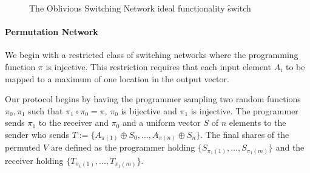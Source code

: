 \begin{figure}[ht]
	\caption{The Oblivious Switching Network ideal functionality \f{switch}}
	\label{fig:perm-ideal}	
\end{figure}


\paragraph{Permutation Network}

We begin with a restricted class of switching networks where the programming function $\pi$ is injective. This restriction requires that each input element $A_i$ to be mapped to a maximum of one location in the output vector. 

Our protocol begins by having the programmer sampling  two random functions $\pi_0,\pi_1$ such that $\pi_1 \circ \pi_0 = \pi$, $\pi_0$ is bijective and $\pi_1$ is injective. The programmer sends   $\pi_1$ to the receiver and $\pi_0$ and a uniform vector $S$ of $n$ elements to the sender who sends $T := \{A_{\pi(1)} \oplus S_0, ...,A_{\pi(n)} \oplus S_n \}$. The final shares of the permuted $V$ are defined as the programmer holding $\{S_{\pi_1(1)}, ..., S_{\pi_1(m)}\}$ and the receiver holding $\{T_{\pi_1(1)}, ..., T_{\pi_1(m)}\}$.



